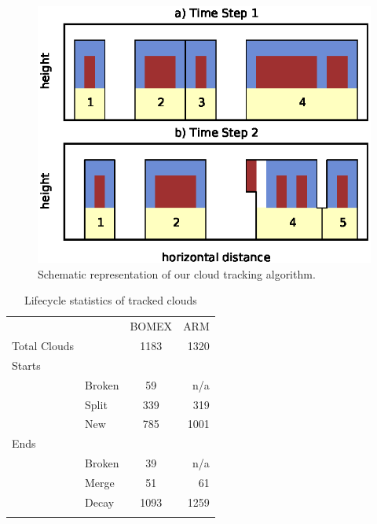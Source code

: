 \documentclass[acp]{copernicus}
\begin{document}
\begin{figure}[t]
\vspace*{2mm}
\begin{center}
\includegraphics[width=\textwidth]{./figures/cloudfinder_instructions}
\end{center}
\caption{Schematic representation of our cloud tracking algorithm.}
\label{fig:cloudfinder_instructions}
\end{figure}





\begin{table}[t]
\caption{Lifecycle statistics of tracked clouds}
\vskip4mm
\centering
\begin{tabular}{llcr}
\tophline
&&BOMEX&ARM\\
\middlehline
Total Clouds&&1183&1320\\
Starts\\
&Broken&59&n/a\\
&Split&339&319\\
&New&785&1001\\
Ends\\
&Broken&39&n/a\\
&Merge&51&61\\
&Decay&1093&1259\\

\bottomhline
\end{tabular}
\end{table}
\end{document}
